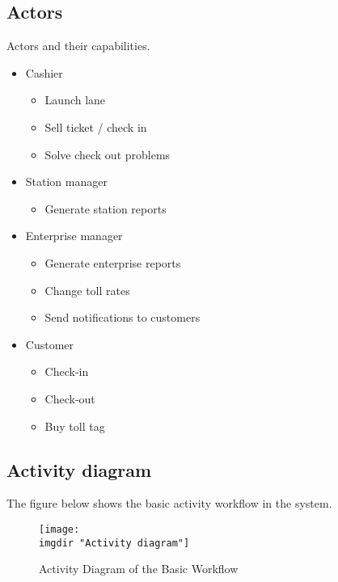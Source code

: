 \subsection{Actors}
Actors and their capabilities.
\begin{itemize}
\item Cashier

\begin{itemize}
  \item Launch lane
  \item Sell ticket / check in
  \item Solve check out problems
\end{itemize}
\end{itemize}

\begin{itemize}
\item Station manager

\begin{itemize}
  \item Generate station reports
\end{itemize}
\end{itemize}

\begin{itemize}
\item Enterprise manager

\begin{itemize}
  \item Generate enterprise reports
  \item Change toll rates
  \item Send notifications to customers
\end{itemize}
\end{itemize}

\begin{itemize}
\item Customer

\begin{itemize}
  \item Check-in
  \item Check-out
  \item Buy toll tag
\end{itemize}
\end{itemize}

\subsection{Activity diagram}
The figure below shows the basic activity workflow in the system.
\begin{figure}[H]
\texttt{[image: \\imgdir "Activity diagram"]}
\centering
\caption{Activity Diagram of the Basic Workflow}
\label{fig:activity_diagram}
\end{figure}

